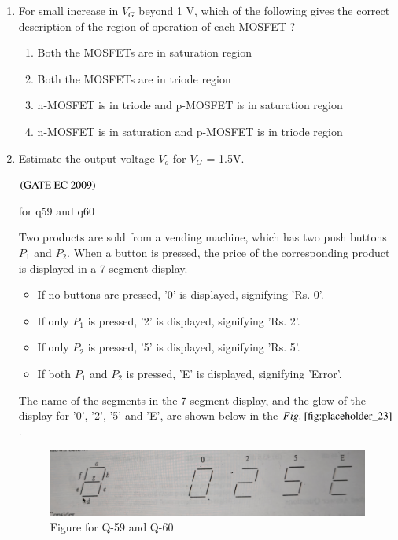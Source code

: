 \documentclass[journal,12pt,onecolumn]{IEEEtran}
\theoremstyle{remark}
\begin{document}
\begin{enumerate}[start=1, label={Q\arabic*.}]
\item For small increase in $V_G$ beyond 1 V, which of the following gives the correct description of the region of operation of each MOSFET ?
\begin{enumerate}
    \item Both the MOSFETs are in saturation region
    \item Both the MOSFETs are in triode region
    \item n-MOSFET is in triode and p-MOSFET is in saturation region
    \item n-MOSFET is in saturation and p-MOSFET is in triode region
\end{enumerate}

\item Estimate the output voltage $V_o$ for $V_G$ = 1.5V.
\begin{enumerate}
\end{enumerate}
\hfill $\left(\text{GATE EC 2009}\right)$

for q59 and q60

Two products are sold from a vending machine, which has two push buttons $P_1$ and $P_2$. When a button is pressed, the price of the corresponding product is displayed in a 7-segment display.
\begin{itemize}

    \item If no buttons are pressed, '0' is displayed, signifying 'Rs. 0'.

    \item If only $P_1$ is pressed, '2' is displayed, signifying 'Rs. 2'.

    \item If only $P_2$ is pressed, '5' is displayed, signifying 'Rs. 5'.

    \item If both $P_1$ and $P_2$ is pressed, 'E' is displayed, signifying 'Error'.
\end{itemize}

The name of the segments in the 7-segment display, and the glow of the display for '0', '2', '5' and 'E', are shown below in the $\figref{fig:placeholder_23}$. 
\begin{figure}[H]
    \centering
    \includegraphics[width=0.5\columnwidth]{figs/img_24.jpg}
    \caption{\centering Figure for Q-59 and Q-60}
    \label{fig:placeholder_23}
\end{figure}


\end{enumerate}
\end{document}
